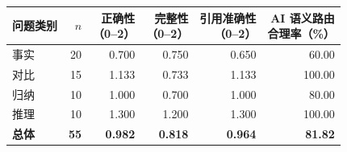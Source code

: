 \begingroup
\small
\setlength{\tabcolsep}{5pt}
\renewcommand{\arraystretch}{1.16}
\begin{tabularx}{\linewidth}{@{}>{\raggedright\arraybackslash}X r r r r r@{}}
\toprule
问题类别 & $n$ & \shortstack{正确性\\（0--2）} & \shortstack{完整性\\（0--2）} & \shortstack{引用准确性\\（0--2）} & \shortstack{AI 语义路由\\合理率（\%）} \\
\midrule
事实 & 20 & 0.700 & 0.750 & 0.650 & 60.00 \\
对比 & 15 & 1.133 & 0.733 & 1.133 & 100.00 \\
归纳 & 10 & 1.000 & 0.700 & 1.000 & 80.00 \\
推理 & 10 & 1.300 & 1.200 & 1.300 & 100.00 \\
\midrule
\textbf{总体} & \textbf{55} & \textbf{0.982} & \textbf{0.818} & \textbf{0.964} & \textbf{81.82} \\
\bottomrule
\end{tabularx}
\par\vspace{4pt}{\footnotesize 三项答案评分取 0、1、2 分；表中为均值。各维度均覆盖对应类别全部题目，失败题保留。语义路由逐题判 0/1，结果为 AI 辅助评分。\par}
\endgroup

